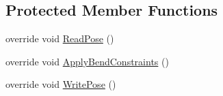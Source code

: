 \subsection*{Protected Member Functions}
\begin{DoxyCompactItemize}
\item 
override void \mbox{\hyperlink{class_root_motion_1_1_final_i_k_1_1_i_k_solver_full_body_biped_a4691b021c0446bb435caf9ba0022406e}{Read\+Pose}} ()
\item 
override void \mbox{\hyperlink{class_root_motion_1_1_final_i_k_1_1_i_k_solver_full_body_biped_ad062f0934df40f03a40e79a94dc32709}{Apply\+Bend\+Constraints}} ()
\item 
override void \mbox{\hyperlink{class_root_motion_1_1_final_i_k_1_1_i_k_solver_full_body_biped_aaf274661bb29e50507fdf3f3f33473b6}{Write\+Pose}} ()
\end{DoxyCompactItemize}
